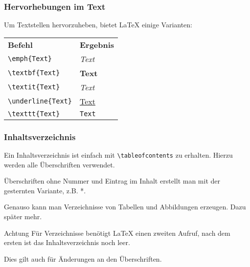 \begin{frame}[fragile]
    \frametitle{Hervorhebungen im Text}
    
    Um Textstellen hervorzuheben, bietet \LaTeX{} einige Varianten:
    \medskip
    \begin{center}
        \begin{tabular}{ll}
            \textbf{Befehl} & \textbf{Ergebnis}\\
            \verb+\emph{Text}+ & \emph{Text}\\
            \verb+\textbf{Text}+ & \textbf{Text}\\
            \verb+\textit{Text}+ & \textit{Text}\\
            \verb+\underline{Text}+ & \underline{Text}\\
            \verb+\texttt{Text}+ & \texttt{Text}
        \end{tabular}
    \end{center}
\end{frame}


\begin{frame}[fragile]
    \frametitle{Inhaltsverzeichnis}
    Ein Inhaltsverzeichnis ist einfach mit \verb+\tableofcontents+ zu erhalten. Hierzu werden alle Überschriften verwendet.
    \medskip    
    
    Überschriften ohne Nummer und Eintrag im Inhalt erstellt man mit der gesternten Variante, z.B. *.
    
    \medskip
    Genauso kann man Verzeichnisse von Tabellen und Abbildungen erzeugen. Dazu später mehr.
    
    \medskip
    \begin{alertblock}{Achtung}
        Für Verzeichnisse benötigt \LaTeX{} einen zweiten Aufruf, nach dem ersten ist das Inhaltsverzeichnis noch leer.
    
        \smallskip
        Dies gilt auch für Änderungen an den Überschriften.
    \end{alertblock}
\end{frame}


